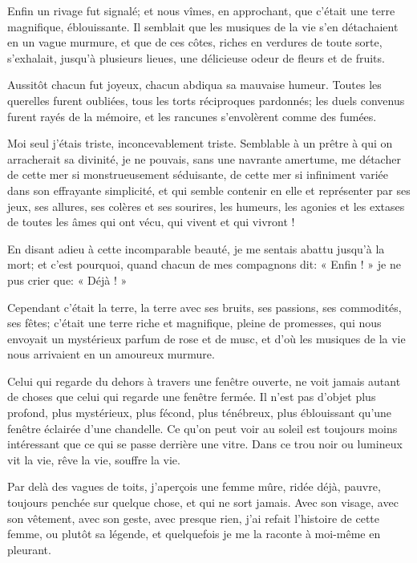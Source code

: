 Enfin un rivage fut signalé; et nous vîmes, en approchant, que
c’était une terre magnifique, éblouissante. Il
semblait que les musiques de la vie s’en détachaient
en un vague murmure, et que de ces côtes, riches en verdures de toute
sorte, s’exhalait, jusqu’à plusieurs
lieues, une délicieuse odeur de fleurs et de fruits.

Aussitôt chacun fut joyeux, chacun abdiqua sa mauvaise humeur. Toutes
les querelles furent oubliées, tous les torts réciproques pardonnés;
les duels convenus furent rayés de la mémoire, et les rancunes
s’envolèrent comme des fumées.

Moi seul j’étais triste, inconcevablement triste.
Semblable à un prêtre à qui on arracherait sa divinité, je ne pouvais,
sans une navrante amertume, me détacher de cette mer si monstrueusement
séduisante, de cette mer si infiniment variée dans son effrayante
simplicité, et qui semble contenir en elle et représenter par ses jeux,
ses allures, ses colères et ses sourires, les humeurs, les agonies et
les extases de toutes les âmes qui ont vécu, qui vivent et qui vivront
!

En disant adieu à cette incomparable beauté, je me sentais abattu
jusqu’à la mort; et c’est pourquoi,
quand chacun de mes compagnons dit: « Enfin ! » je ne pus crier que: «
Déjà ! »

Cependant c’était la terre, la terre avec ses bruits,
ses passions, ses commodités, ses fêtes; c’était une
terre riche et magnifique, pleine de promesses, qui nous envoyait un
mystérieux parfum de rose et de musc, et d’où les
musiques de la vie nous arrivaient en un amoureux murmure.


Celui qui regarde du dehors à travers une fenêtre ouverte, ne voit
jamais autant de choses que celui qui regarde une fenêtre fermée. Il
n’est pas d’objet plus profond, plus
mystérieux, plus fécond, plus ténébreux, plus éblouissant
qu’une fenêtre éclairée d’une
chandelle. Ce qu’on peut voir au soleil est toujours
moins intéressant que ce qui se passe derrière une vitre. Dans ce trou
noir ou lumineux vit la vie, rêve la vie, souffre la vie.

Par delà des vagues de toits, j’aperçois une femme
mûre, ridée déjà, pauvre, toujours penchée sur quelque chose, et qui ne
sort jamais. Avec son visage, avec son vêtement, avec son geste, avec
presque rien, j’ai refait l’histoire
de cette femme, ou plutôt sa légende, et quelquefois je me la raconte à
moi{}-même en pleurant.


